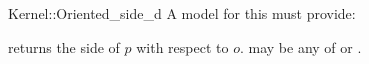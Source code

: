 \begin{ccRefFunctionObjectConcept}{Kernel::Oriented_side_d}
A model for this must provide:


{returns the side of $p$ with respect to $o$. 
  may be any of  or 
 .}

\end{ccRefFunctionObjectConcept}
